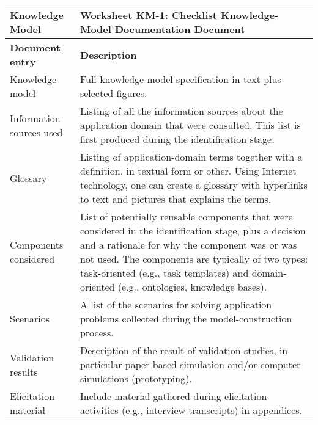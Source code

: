 \begin{tabular}{%
	|>{\colleft}p{3.5cm}%
	|>{\colleft}p{8cm}|}
\hline
\bf Knowledge Model 	& \bf Worksheet KM-1: Checklist Knowledge-Model
Documentation Document \\
\hline\hline
\bf Document entry	& \bf Description \\ 
\hline
\sc Knowledge model	& 
Full knowledge-model specification in text
plus selected figures.
\\ \hline
\sc Information sources used &
Listing of all the information sources about the application domain
that were consulted. This list is first produced during the identification
stage.
\\ \hline
\sc Glossary & 
Listing of application-domain terms together with a definition, in
textual form or other. Using Internet technology, one can create a
glossary with hyperlinks to text and pictures that explains the terms. 
\\ \hline
\sc Components considered &
List of potentially reusable components that were considered in the
identification stage, plus a decision and a rationale for why the
component was or was not used. The components are typically of two
types: task-oriented (e.g., task templates) and domain-oriented
(e.g., ontologies, knowledge bases). 
\\ \hline
\sc Scenarios &
A list of the scenarios for solving application problems collected
during the model-construction process. 
\\ \hline
\sc Validation results & 
Description of the result of validation studies, in particular
paper-based simulation and/or computer simulations (prototyping).
\\ \hline
\sc Elicitation material &
Include material gathered during elicitation activities (e.g., interview
transcripts) in appendices.
\\ \hline
\end{tabular}

